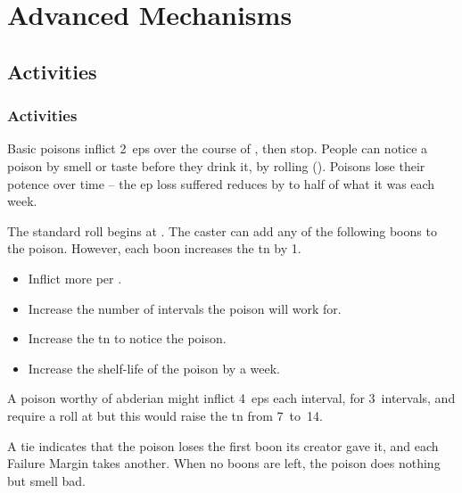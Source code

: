 \chapter{Advanced Mechanisms}

\label{skill_uses}

\section{Activities}

\begin{multicols}{2}

\togglefalse{examplecharacter}

\subsection{ Activities}
\label{downtimeActions}


Basic poisons inflict 2~\glspl{ep} over the course of , then stop.
People can notice a poison by smell or taste before they drink it, by rolling  (\tn[7]).
Poisons lose their potence over time -- the \gls{ep} loss suffered reduces by to half of what it was each week.

The standard roll begins at \tn[7].
The caster can add any of the following boons to the poison.
However, each boon increases the \gls{tn} by 1.

\begin{itemize}
  \item
  Inflict  more per .
  \item
  Increase the number of \glspl{interval} the poison will work for.
  \item
  Increase the \gls{tn} to notice the poison.
  \item
  Increase the shelf-life of the poison by a week.
\end{itemize}

A poison worthy of \gls{abderian} might inflict 4~\glspl{ep} each \gls{interval}, for 3~\glspl{interval}, and require a  roll at \tn[10] but this would raise the \gls{tn} from 7~to~14.

A tie indicates that the poison loses the first boon its creator gave it, and each Failure Margin takes another.
When no boons are left, the poison does nothing but smell bad.


\end{multicols}
